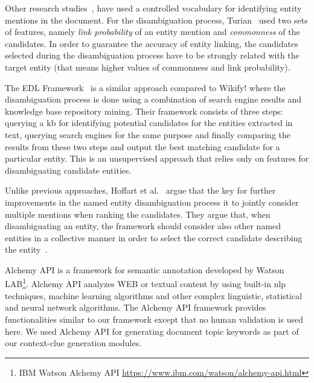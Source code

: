 Other research studies~\cite{6, dbpedia}, have used a controlled vocabulary for identifying entity mentions in the document. For the disambiguation process, Turian~\cite{6} used two sets of features, namely \textit{link probability} of an entity mention and \textit{commonness} of the candidates. 
In order to guarantee the accuracy of entity linking, the candidates selected during the disambiguation process have to be strongly related with the target entity (that means higher values of commonness and link probability).~\cite{6}

The EDL Framework~\cite{19} is a similar approach compared to Wikify! where the disambiguation process is done using a combination of search engine results and knowledge base repository mining. Their framework consists of three steps: querying a \ac{kb} for identifying potential candidates for the entities extracted in text, querying search engines for the same purpose and finally comparing the results from these two steps and output the best matching candidate for a particular entity. This is an unsupervised approach that relies only on features for disambiguating candidate entities.~\cite{19}

Unlike previous approaches, Hoffart et al.~\cite{21} argue that the key for further improvements in the named entity disambiguation process it to jointly consider multiple mentions when ranking the candidates. They argue that, when disambiguating an entity, the framework should consider also other named entities in a collective manner in order to select the correct candidate describing the entity~\cite{21}.

Alchemy API is a framework for semantic annotation developed by Watson LAB\footnote{IBM Watson Alchemy API \url{https://www.ibm.com/watson/alchemy-api.html}}. Alchemy API analyzes WEB or textual content by using built-in \ac{nlp} techniques, machine learning algorithms and other complex linguistic, statistical and neural network algorithms. The Alchemy API framework provides functionalities similar to our framework except that no human validation is used here. We used Alchemy API for generating document topic keywords as part of our context-clue generation modules. 

